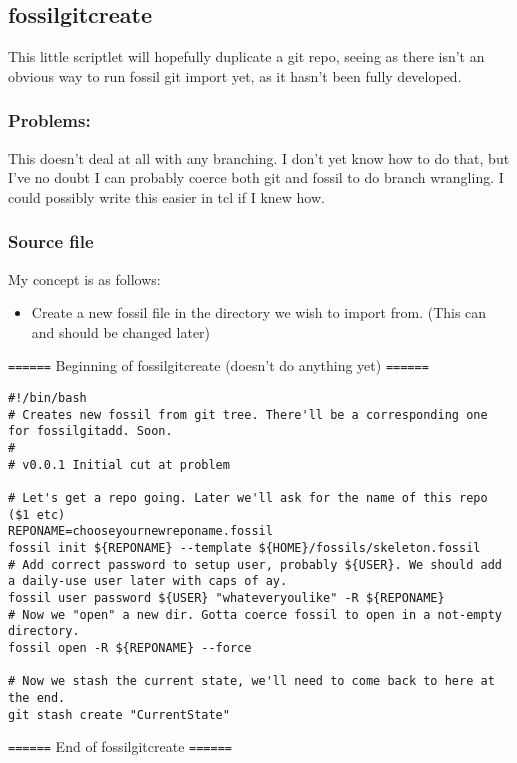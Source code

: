 \documentclass[11pt]{article}
\begin{document}
\subsection*{fossilgitcreate}
\label{sec:org827a595}
This little scriptlet will hopefully duplicate a git repo, seeing as there isn't an obvious way
to run fossil git import yet, as it hasn't been fully developed.
\subsubsection*{Problems:}
\label{sec:org6fd7cc8}
This doesn't deal at all with any branching. I don't yet know how to do that, but I've no doubt I can
probably coerce both git and fossil to do branch wrangling.
I could possibly write this easier in tcl if I knew how.
\subsubsection*{Source file}
\label{sec:orged64274}
My concept is as follows:

\begin{itemize}
\item Create a new fossil file in the directory we wish to import from. (This can and should be changed later)
\end{itemize}

\texttt{======} Beginning of fossilgitcreate (doesn't do anything yet) \texttt{======}

\begin{verbatim}
#!/bin/bash
# Creates new fossil from git tree. There'll be a corresponding one for fossilgitadd. Soon.
#
# v0.0.1 Initial cut at problem

# Let's get a repo going. Later we'll ask for the name of this repo ($1 etc)
REPONAME=chooseyournewreponame.fossil
fossil init ${REPONAME} --template ${HOME}/fossils/skeleton.fossil
# Add correct password to setup user, probably ${USER}. We should add a daily-use user later with caps of ay.
fossil user password ${USER} "whateveryoulike" -R ${REPONAME}
# Now we "open" a new dir. Gotta coerce fossil to open in a not-empty directory.
fossil open -R ${REPONAME} --force

# Now we stash the current state, we'll need to come back to here at the end.
git stash create "CurrentState"
\end{verbatim}

\texttt{======} End of fossilgitcreate \texttt{======}
\end{document}
